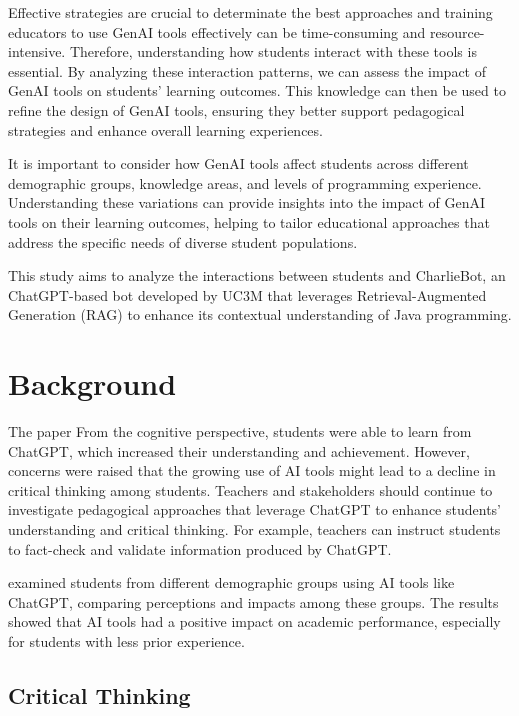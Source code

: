 \documentclass[conference]{IEEEtran}
\begin{document}

Effective strategies are crucial to determinate the best approaches and training
educators to use GenAI tools effectively can be time-consuming and
resource-intensive. Therefore, understanding how students interact with these
tools is essential. By analyzing these interaction patterns, we can assess the
impact of GenAI tools on students' learning outcomes.
This knowledge can then be used to refine the design of GenAI tools, ensuring
they better support pedagogical strategies and enhance overall learning
experiences.


It is important to consider how GenAI tools affect students across different
demographic groups, knowledge areas, and levels of programming experience.
Understanding these variations can provide insights into the impact of GenAI
tools on their learning outcomes, helping to tailor educational approaches that
address the specific needs of diverse student populations.


This study aims to analyze the interactions between students and CharlieBot,
an ChatGPT-based bot developed by UC3M that leverages Retrieval-Augmented
Generation (RAG) to enhance its contextual understanding of Java programming.

\section{Background}

The paper \cite{Lo24} From the cognitive perspective, students were able to
learn from ChatGPT, which increased their understanding and achievement.
However, concerns were raised that the growing use of AI tools might lead to
a decline in critical thinking among students. Teachers and stakeholders should
continue to investigate pedagogical approaches that leverage ChatGPT to enhance
students' understanding and critical thinking. For example, teachers can
instruct students to fact-check and validate information produced by ChatGPT.




examined students from different demographic groups
using AI tools like ChatGPT, comparing perceptions and impacts
among these groups. The results showed that AI tools had a positive impact on
academic performance, especially for students with less prior experience.

\subsection{Critical Thinking}
\end{document}
